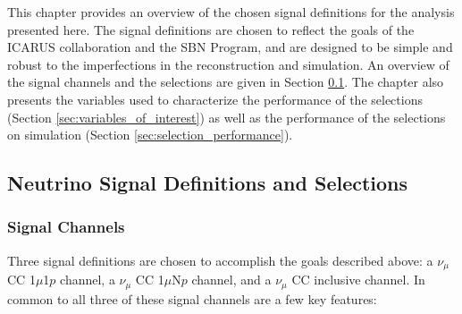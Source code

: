 This chapter provides an overview of the chosen signal definitions for the analysis presented here. The signal definitions are chosen to reflect the goals of the ICARUS collaboration and the SBN Program, and are designed to be simple and robust to the imperfections in the reconstruction and simulation. An overview of the signal channels and the selections are given in Section \ref{sec:neutrino_signal_definitions}. The chapter also presents the variables used to characterize the performance of the selections (Section \ref{sec:variables_of_interest}) as well as the performance of the selections on simulation (Section \ref{sec:selection_performance}).

\subsection{Neutrino Signal Definitions and Selections}
\label{sec:neutrino_signal_definitions}

\subsubsection{Signal Channels}
\label{sec:signal_channels}

Three signal definitions are chosen to accomplish the goals described above: a $\nu_\mu$ CC 1$\mu$1$p$ channel, a $\nu_\mu$ CC 1$\mu$N$p$ channel, and a $\nu_\mu$ CC inclusive channel. In common to all three of these signal channels are a few key features:

